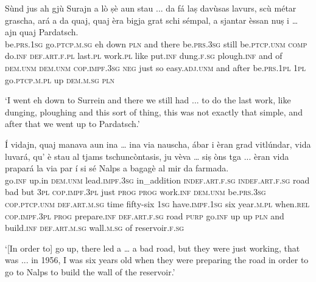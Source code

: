 \begin{linenumbers}
\gll   Sùnd jus ah gjù Surajn a lò ṣè aun stau ... da fá laṣ davùsas lavurs, scù métar grascha, ará a da quaj, quaj èra bigja grat schi sémpal, a sjantar èssan nuṣ i … ajn quaj Pardatsch. \\
 be.\textsc{prs.1sg} go.\textsc{ptcp.m.sg} eh down \textsc{pln} and there be.\textsc{prs.3sg}  still be.\textsc{ptcp.unm} {} \textsc{comp} do.\textsc{inf} \textsc{def.art.f.pl} last.\textsc{pl} work.\textsc{pl} like put.\textsc{inf} dung.\textsc{f.sg}  plough.\textsc{inf} and of \textsc{dem.unm} \textsc{dem.unm}  \textsc{cop.impf.3sg} \textsc{neg} just so easy.\textsc{adj.unm} and after be.\textsc{prs.1pl} \textsc{1pl} go.\textsc{ptcp.m.pl} {} up \textsc{dem.m.sg} \textsc{pln}\\
\end{linenumbers}
\medskip
\glt `I went eh down to Surrein and there we still had ... to do the last work, like dunging, ploughing and this sort of thing, this was not exactly that simple, and after that we went up to Pardatsch.'
\medskip

\begin{linenumbers}
\gll Í vidajn, quaj manava aun ina … ina via nauscha, ábar i èran grad vitlúndar, vida luvará, qu’ è stau al tjams tschuncòntasis, ju vèva … siṣ òns tga ... èran vida prapará la via par í si sé Nalps a bagagè al mir da farmada.   \\
 go.\textsc{inf} up.in \textsc{dem.unm} lead.\textsc{impf.3sg} in\_addition  \textsc{indef.art.f.sg} {} \textsc{indef.art.f.sg} road bad but \textsc{3pl} \textsc{cop.impf.3pl} just \textsc{prog} \textsc{prog} work.\textsc{inf} \textsc{dem.unm} be.\textsc{prs.3sg} \textsc{cop.ptcp.unm} \textsc{def.art.m.sg}  time fifty-six \textsc{1sg} have.\textsc{impf.1sg} {} six year.\textsc{m.pl} when.\textsc{rel} {} \textsc{cop.impf.3pl} \textsc{prog} prepare.\textsc{inf} \textsc{def.art.f.sg} road \textsc{purp} go.\textsc{inf} up up \textsc{pln} and build.\textsc{inf} \textsc{def.art.m.sg} wall.\textsc{m.sg} of reservoir.\textsc{f.sg} \\ 
\end{linenumbers} 
\medskip
\glt `[In order to] go up, there led a … a bad road, but they were just working, that was ... in 1956, I was six years old when they were preparing the road in order to go to Nalps to build the wall of the reservoir.'
\medskip

